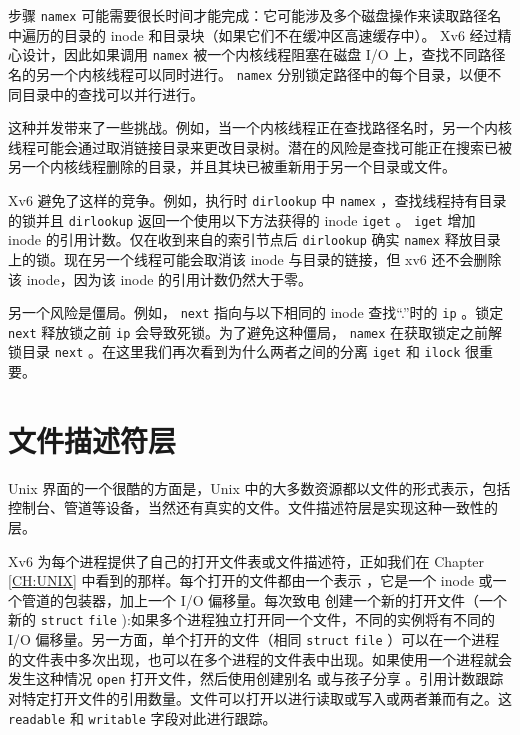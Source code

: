 \documentclass[UTF8]{article}
\begin{document}
步骤
    \lstinline{namex}    可能需要很长时间才能完成：它可能涉及多个磁盘操作来读取路径名中遍历的目录的 inode 和目录块（如果它们不在缓冲区高速缓存中）。 Xv6 经过精心设计，因此如果调用
    \lstinline{namex}    被一个内核线程阻塞在磁盘 I/O 上，查找不同路径名的另一个内核线程可以同时进行。
    \lstinline{namex}    分别锁定路径中的每个目录，以便不同目录中的查找可以并行进行。  

这种并发带来了一些挑战。例如，当一个内核线程正在查找路径名时，另一个内核线程可能会通过取消链接目录来更改目录树。潜在的风险是查找可能正在搜索已被另一个内核线程删除的目录，并且其块已被重新用于另一个目录或文件。  

Xv6 避免了这样的竞争。例如，执行时
    \lstinline{dirlookup}    中
    \lstinline{namex}    ，查找线程持有目录的锁并且
    \lstinline{dirlookup}    返回一个使用以下方法获得的 inode
    \lstinline{iget}    。
    \lstinline{iget}    增加 inode 的引用计数。仅在收到来自的索引节点后
    \lstinline{dirlookup}    确实
    \lstinline{namex}    释放目录上的锁。现在另一个线程可能会取消该 inode 与目录的链接，但 xv6 还不会删除该 inode，因为该 inode 的引用计数仍然大于零。  

另一个风险是僵局。例如，
    \lstinline{next}    指向与以下相同的 inode
 查找“.”时的    \lstinline{ip}   。锁定
    \lstinline{next}    释放锁之前
    \lstinline{ip}    会导致死锁。为了避免这种僵局，
    \lstinline{namex}    在获取锁定之前解锁目录
    \lstinline{next}    。在这里我们再次看到为什么两者之间的分离
    \lstinline{iget}    和
    \lstinline{ilock}    很重要。
    \section{文件描述符层  }     

Unix 界面的一个很酷的方面是，Unix 中的大多数资源都以文件的形式表示，包括控制台、管道等设备，当然还有真实的文件。文件描述符层是实现这种一致性的层。  

Xv6 为每个进程提供了自己的打开文件表或文件描述符，正如我们在 Chapter~    \ref{CH:UNIX}    中看到的那样。每个打开的文件都由一个表示
        ，它是一个 inode 或一个管道的包装器，加上一个 I/O 偏移量。每次致电
        创建一个新的打开文件（一个新的
    \lstinline{struct}   
    \lstinline{file}    ):如果多个进程独立打开同一个文件，不同的实例将有不同的 I/O 偏移量。另一方面，单个打开的文件（相同
    \lstinline{struct}   
    \lstinline{file}    ）可以在一个进程的文件表中多次出现，也可以在多个进程的文件表中出现。如果使用一个进程就会发生这种情况
    \lstinline{open}    打开文件，然后使用创建别名
        或与孩子分享
        。引用计数跟踪对特定打开文件的引用数量。文件可以打开以进行读取或写入或两者兼而有之。这
    \lstinline{readable}    和
    \lstinline{writable}    字段对此进行跟踪。  
\end{document}
